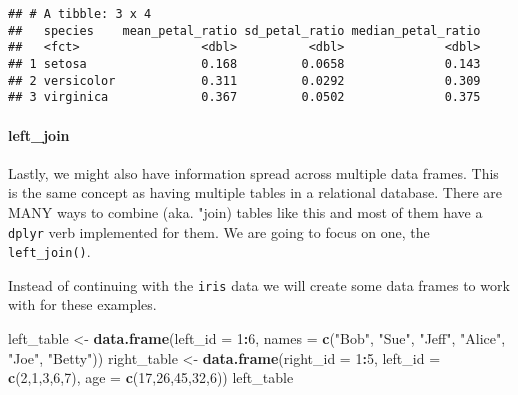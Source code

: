 \documentclass[]{article}
\newenvironment{Shaded}{\begin{snugshade}}{\end{snugshade}}
\newcommand{\DataTypeTok}[1]{\textcolor[rgb]{0.13,0.29,0.53}{#1}}
\newcommand{\DecValTok}[1]{\textcolor[rgb]{0.00,0.00,0.81}{#1}}
\newcommand{\KeywordTok}[1]{\textcolor[rgb]{0.13,0.29,0.53}{\textbf{#1}}}
\newcommand{\NormalTok}[1]{#1}
\newcommand{\OperatorTok}[1]{\textcolor[rgb]{0.81,0.36,0.00}{\textbf{#1}}}
\newcommand{\StringTok}[1]{\textcolor[rgb]{0.31,0.60,0.02}{#1}}
\let\oldparagraph\paragraph
\renewcommand{\paragraph}[1]{\oldparagraph{#1}\mbox{}}
\begin{document}
\begin{verbatim}
## # A tibble: 3 x 4
##   species    mean_petal_ratio sd_petal_ratio median_petal_ratio
##   <fct>                 <dbl>          <dbl>              <dbl>
## 1 setosa                0.168         0.0658              0.143
## 2 versicolor            0.311         0.0292              0.309
## 3 virginica             0.367         0.0502              0.375
\end{verbatim}

\hypertarget{left_join}{%
\paragraph{left\_join}\label{left_join}}

Lastly, we might also have information spread across multiple data
frames. This is the same concept as having multiple tables in a
relational database. There are MANY ways to combine (aka. "join) tables
like this and most of them have a \texttt{dplyr} verb implemented for
them. We are going to focus on one, the \texttt{left\_join()}.

Instead of continuing with the \texttt{iris} data we will create some
data frames to work with for these examples.

\begin{Shaded}
\begin{Highlighting}[]
\NormalTok{left_table <-}\StringTok{ }\KeywordTok{data.frame}\NormalTok{(}\DataTypeTok{left_id =} \DecValTok{1}\OperatorTok{:}\DecValTok{6}\NormalTok{, }
                         \DataTypeTok{names =} \KeywordTok{c}\NormalTok{(}\StringTok{"Bob"}\NormalTok{, }\StringTok{"Sue"}\NormalTok{, }\StringTok{"Jeff"}\NormalTok{, }\StringTok{"Alice"}\NormalTok{, }\StringTok{"Joe"}\NormalTok{, }\StringTok{"Betty"}\NormalTok{))}
\NormalTok{right_table <-}\StringTok{ }\KeywordTok{data.frame}\NormalTok{(}\DataTypeTok{right_id =} \DecValTok{1}\OperatorTok{:}\DecValTok{5}\NormalTok{, }
                          \DataTypeTok{left_id =} \KeywordTok{c}\NormalTok{(}\DecValTok{2}\NormalTok{,}\DecValTok{1}\NormalTok{,}\DecValTok{3}\NormalTok{,}\DecValTok{6}\NormalTok{,}\DecValTok{7}\NormalTok{), }
                          \DataTypeTok{age =} \KeywordTok{c}\NormalTok{(}\DecValTok{17}\NormalTok{,}\DecValTok{26}\NormalTok{,}\DecValTok{45}\NormalTok{,}\DecValTok{32}\NormalTok{,}\DecValTok{6}\NormalTok{)) }
\NormalTok{left_table}
\end{Highlighting}
\end{Shaded}
\end{document}
